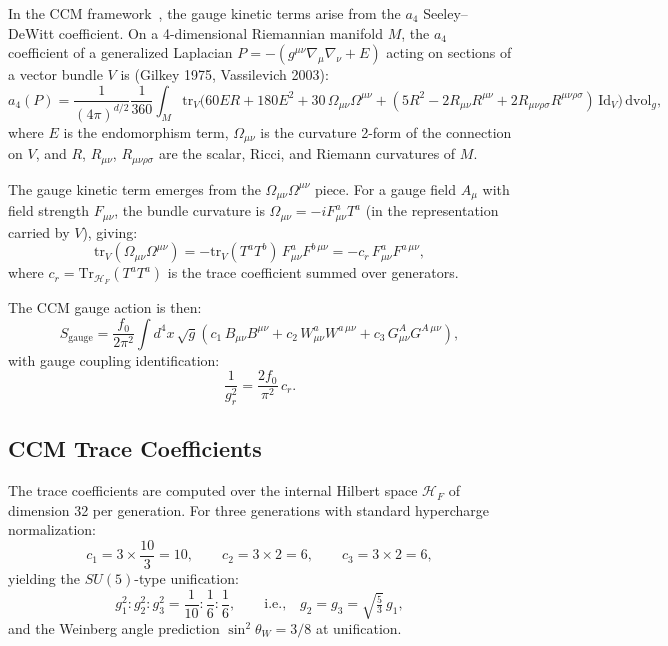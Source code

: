 \documentclass[12pt,a4paper]{article}
\begin{document}
In the CCM framework~\cite{CCM2007}, the gauge kinetic terms arise from the
$a_4$ Seeley--DeWitt coefficient.  On a 4-dimensional Riemannian manifold $M$,
the $a_4$ coefficient of a generalized Laplacian $P = -(g^{\mu\nu}\nabla_\mu\nabla_\nu + E)$
acting on sections of a vector bundle $V$ is (Gilkey 1975, Vassilevich 2003):
\begin{equation}\label{eq:a4-standard}
\boxed{
a_4(P) = \frac{1}{(4\pi)^{d/2}} \frac{1}{360}
\int_M \mathrm{tr}_V\!\Big(
60ER + 180E^2 + 30\,\Omega_{\mu\nu}\Omega^{\mu\nu}
+ (5R^2 - 2R_{\mu\nu}R^{\mu\nu} + 2R_{\mu\nu\rho\sigma}R^{\mu\nu\rho\sigma})
\,\mathrm{Id}_V
\Big)\,\mathrm{dvol}_g,
}
\end{equation}
where $E$ is the endomorphism term, $\Omega_{\mu\nu}$ is the curvature
2-form of the connection on $V$, and $R$, $R_{\mu\nu}$, $R_{\mu\nu\rho\sigma}$
are the scalar, Ricci, and Riemann curvatures of $M$.

The gauge kinetic term emerges from the $\Omega_{\mu\nu}\Omega^{\mu\nu}$ piece.
For a gauge field $A_\mu$ with field strength $F_{\mu\nu}$, the bundle
curvature is $\Omega_{\mu\nu} = -iF_{\mu\nu}^a T^a$ (in the representation
carried by $V$), giving:
\begin{equation}\label{eq:gauge-from-omega}
\mathrm{tr}_V(\Omega_{\mu\nu}\Omega^{\mu\nu})
= -\mathrm{tr}_V(T^a T^b)\,F^a_{\mu\nu}F^{b\,\mu\nu}
= -c_r\,F^a_{\mu\nu}F^{a\,\mu\nu},
\end{equation}
where $c_r = \mathrm{Tr}_{\mathcal{H}_F}(T^a T^a)$ is the trace coefficient
summed over generators.

The CCM gauge action is then:
\begin{equation}\label{eq:gauge-action-ccm}
S_{\mathrm{gauge}} = \frac{f_0}{2\pi^2}
\int d^4x\,\sqrt{g}\left(
c_1\,B_{\mu\nu}B^{\mu\nu}
+ c_2\,W^a_{\mu\nu}W^{a\,\mu\nu}
+ c_3\,G^A_{\mu\nu}G^{A\,\mu\nu}
\right),
\end{equation}
with gauge coupling identification:
\begin{equation}\label{eq:coupling-from-trace}
\frac{1}{g_r^2} = \frac{2f_0}{\pi^2}\,c_r.
\end{equation}

\subsection{CCM Trace Coefficients}
\label{sec:ccm-traces}

The trace coefficients are computed over the internal Hilbert space
$\mathcal{H}_F$ of dimension 32 per generation.  For three generations
with standard hypercharge normalization:
\begin{equation}\label{eq:ccm-traces}
c_1 = 3 \times \frac{10}{3} = 10, \qquad
c_2 = 3 \times 2 = 6, \qquad
c_3 = 3 \times 2 = 6,
\end{equation}
yielding the $SU(5)$-type unification:
\begin{equation}
g_1^2 : g_2^2 : g_3^2 = \frac{1}{10} : \frac{1}{6} : \frac{1}{6},
\qquad\text{i.e.,}\quad g_2 = g_3 = \sqrt{\tfrac{5}{3}}\,g_1,
\end{equation}
and the Weinberg angle prediction $\sin^2\theta_W = 3/8$ at unification.
\end{document}
